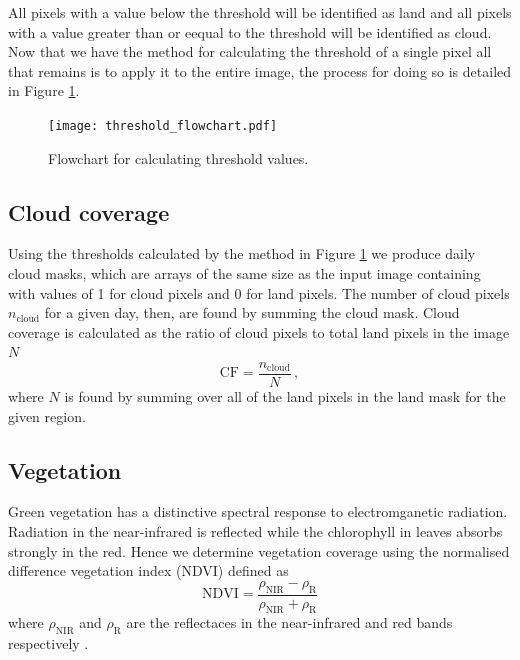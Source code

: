 All pixels with a value below the threshold will be identified as land and all
pixels with a value greater than or eequal to the threshold will be identified
as cloud. Now that we have the method for calculating the threshold of a single
pixel all that remains is to apply it to the entire image, the process for doing
so is detailed in Figure \ref{fig:thr_fc}.
\begin{figure}[t!]
  \centering
  \texttt{[image: threshold\_flowchart.pdf]}
  \caption{Flowchart for calculating threshold values.}
  \label{fig:thr_fc}
\end{figure}

\subsection{Cloud coverage}
Using the thresholds calculated by the method in Figure \ref{fig:thr_fc} we
produce daily cloud masks, which are arrays of the same size as the input image
containing with values of 1 for cloud pixels and 0 for land pixels. The number
of cloud pixels $n_{\mathrm{cloud}}$ for a given day, then, are found by summing
the cloud mask. Cloud coverage is calculated as the ratio of cloud pixels to
total land pixels in the image $N$
\begin{equation}
  \mathrm{CF} = \frac{n_{\mathrm{cloud}}}{N} \,,
  \label{eq:cloud_frac}
\end{equation}
where $N$ is found by summing over all of the land pixels in the land mask for
the given region.

\subsection{Vegetation}
Green vegetation has a distinctive spectral response to electromganetic
radiation. Radiation in the near-infrared is reflected while the chlorophyll in
leaves absorbs strongly in the red. Hence we determine vegetation coverage using
the normalised difference vegetation index (NDVI) defined as
\begin{equation}
  \mathrm{NDVI} = \frac{\rho_{\mathrm{NIR}}-\rho_{\mathrm{R}}}{\rho_{\mathrm{NIR}}+\rho_{\mathrm{R}}}
  \label{eq:ndvi}
\end{equation}
where $\rho_{\mathrm{NIR}}$ and $\rho_{\mathrm{R}}$ are the reflectaces in the
near-infrared and red bands respectively \citep{tucker1979}.
